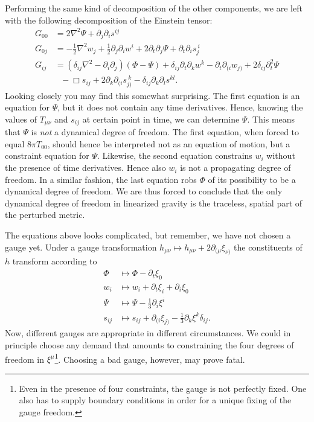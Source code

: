 \documentclass[twoside,utf8]{article}
\begin{document}
Performing the same kind of decomposition of the other components, we are left with the following decomposition of the Einstein tensor:
\begin{align*}
  G_{00} &= 2\nabla^2 \Psi + \partial_j \partial_i s^{ij} \\
  G_{0j} &= -\frac{1}{2}\nabla^2 w_j + \frac{1}{2}\partial_j\partial_i w^i
            +2\partial_t \partial_j \Psi + \partial_t \partial_i s_j^{\ i} \\
  G_{ij} &= (\delta_{ij}\nabla^2-\partial_i\partial_j)(\Phi-\Psi)
            +\delta_{ij}\partial_t \partial_k w^k - \partial_t\partial_{(i}w_{j)} + 2\delta_{ij}\partial_t^2 \Psi \\
         & \ \ \ -\Box s_{ij} + 2\partial_k \partial_{(i}s_{j)}^{\ k} -\delta_{ij}\partial_{k}\partial_{l}s^{kl}.
\end{align*}
Looking closely you may find this somewhat surprising. The first equation is an equation for $\Psi$, but it does not contain any time derivatives. Hence, knowing the values of $T_{\mu\nu}$ and $s_{ij}$ at certain point in time, we can determine $\Psi$. This means that $\Psi$ is {\it not} a dynamical degree of freedom. The first equation, when forced to equal $8\pi T_{00}$, should hence be interpreted not as an equation of motion, but a constraint equation for $\Psi$. Likewise, the second equation constrains $w_i$ without the presence of time derivatives. Hence also $w_i$ is not a propagating degree of freedom. In a similar fashion, the last equation robs $\Phi$ of its possibility to be a dynamical degree of freedom. We are thus forced to conclude that the only dynamical degree of freedom in linearized gravity is the traceless, spatial part of the perturbed metric.

The equations above looks complicated, but remember, we have not chosen a gauge yet. Under a gauge transformation $h_{\mu\nu} \mapsto h_{\mu\nu}+2\partial_{(\mu}\xi_{\nu)}$ the constituents of $h$ transform according to
\begin{align*}
  \Phi    & \mapsto \Phi - \partial_{t}\xi_{0}  \\
  w_i     & \mapsto w_i + \partial_t \xi_i + \partial_i \xi_0 \\
  \Psi    & \mapsto \Psi - \frac{1}{3}\partial_i \xi^i \\
  s_{ij}  & \mapsto s_{ij} + \partial_{(i}\xi_{j)}-\frac{1}{3}\partial_k\xi^k\delta_{ij}.
\end{align*}
Now, different gauges are appropriate in different circumstances. We could in principle choose any demand that amounts to constraining the four degrees of freedom in $\xi^\mu$\footnote{Even in the presence of four constraints, the gauge is not perfectly fixed. One also has to supply boundary conditions in order for a unique fixing of the gauge freedom.}. Choosing a bad gauge, however, may prove fatal.
\end{document}
